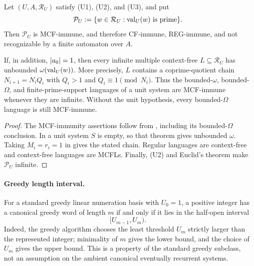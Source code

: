 \begin{corollary}
  \label{thm:recurrent-numeration-prime-cf-immunity}
  Let \((U,A,\mathcal R_U)\) satisfy \textup{(U1)}, \textup{(U2)}, and
  \textup{(U3)}, and put
  \[
    \mathcal P_U
      :=\{w\in\mathcal R_U:\operatorname{val}_U(w)\text{ is prime}\}.
  \]
  Then \(\mathcal P_U\) is MCF-immune, and therefore CF-immune,
  REG-immune, and not recognizable by a finite automaton over \(A\).

  If, in addition, \(\lvert a_0 \rvert=1\), then every infinite multiple
  context-free
  \(L\subseteq\mathcal R_U\) has unbounded
  \(\omega(\operatorname{val}_U(w))\). More precisely, \(L\) contains a
  coprime-quotient chain \(N_{i+1}=N_iQ_i\) with
  \(Q_i>1\) and \(Q_i\equiv1\pmod {N_i}\). Thus the bounded-\(\omega\),
  bounded-\(\Omega\), and finite-prime-support languages of a unit
  system are MCF-immune whenever they are infinite. Without the unit
  hypothesis, every bounded-\(\Omega\) language is still MCF-immune.
\end{corollary}

\begin{proof}
  The MCF-immunity assertions follow from
  , including its
  bounded-\(\Omega\) conclusion. In a unit system \(S\) is empty, so
  that theorem gives unbounded \(\omega\). Taking
  \(M_i=r_i=1\) in
   gives the stated chain.
  Regular languages are context-free and context-free languages are
  MCFLs. Finally, \textup{(U2)} and Euclid's theorem make
  \(\mathcal P_U\) infinite.
\end{proof}

\paragraph{Greedy length interval.}
For a standard greedy linear numeration basis with \(U_0=1\), a positive
integer has a canonical greedy word of length \(m\) if and only if it lies
in the half-open interval
\[
  [U_{m-1},U_m).
\]
Indeed, the greedy algorithm chooses the least threshold \(U_m\) strictly
larger than the represented integer; minimality of \(m\) gives the lower
bound, and the choice of \(U_m\) gives the upper bound. This is a property
of the standard greedy subclass, not an assumption on the ambient
canonical eventually recurrent systems.

